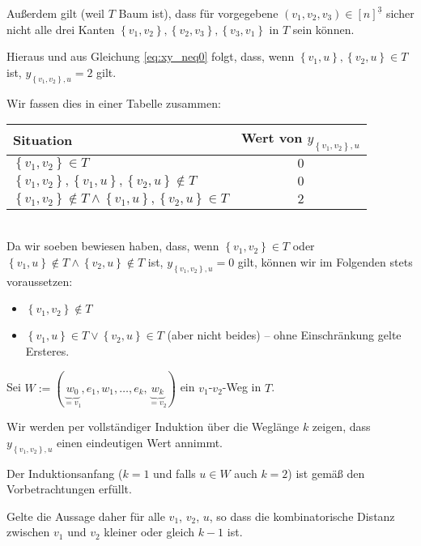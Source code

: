 \documentclass[10p,a4paper,BCOR = 12mm, DIV=15]{scrbook}
\begin{document}
\begin{bew}
Außerdem gilt (weil $T$ Baum ist), dass für vorgegebene $\left(v_1, v_2, v_3\right) \in \left[n\right]^{\underline{3}}$ sicher nicht alle drei Kanten $\left\{v_1, v_2\right\}, \left\{v_2, v_3\right\}, \left\{v_3, v_1\right\}$ in $T$ sein können.

Hieraus und aus Gleichung \eqref{eq:xy_neq0} folgt, dass, wenn $\left\{v_1, u\right\}, \left\{v_2, u\right\} \in T$ ist, $y_{\left\{v_1, v_2\right\}, u} = 2$ gilt.

Wir fassen dies in einer Tabelle zusammen: \\

\begin{tabular}{| l | c |}
\hline
Situation & Wert von $y_{\left\{v_1, v_2\right\}, u}$ \\
\hline
$\left\{v_1, v_2\right\} \in T$ & $0$ \\
$\left\{v_1, v_2\right\}, \left\{v_1, u\right\}, \left\{v_2, u\right\} \notin T$ & $0$ \\
$\left\{v_1, v_2\right\} \notin T \wedge \left\{v_1, u\right\}, \left\{v_2, u\right\} \in T$ & $2$ \\
\hline
\end{tabular} \\

Da wir soeben bewiesen haben, dass, wenn $\left\{v_1, v_2\right\} \in T$ oder $\left\{v_1, u\right\} \notin T \wedge \left\{v_2, u\right\} \notin T$ ist, $y_{\left\{v_1, v_2\right\}, u} = 0$ gilt, können wir im Folgenden stets voraussetzen:
\begin{itemize}
\item $\left\{v_1, v_2\right\} \notin T$
\item $\left\{v_1, u\right\} \in T \vee \left\{v_2, u\right\} \in T$ (aber nicht beides) -- ohne Einschränkung gelte Ersteres.
\end{itemize}

Sei $W:=\left(\underbrace{w_0}_{=v_1}, e_1, w_1, \ldots, e_k, \underbrace{w_k}_{=v_2}\right)$ ein $v_1$-$v_2$-Weg in $T$.

Wir werden per vollständiger Induktion über die Weglänge $k$ zeigen, dass $y_{\left\{v_1, v_2\right\}, u}$ einen eindeutigen Wert annimmt.

Der Induktionsanfang ($k=1$ und falls $u\in W$ auch $k=2$) ist gemäß den Vorbetrachtungen erfüllt.

Gelte die Aussage daher für alle $v_1$, $v_2$, $u$, so dass die kombinatorische Distanz zwischen $v_1$ und $v_2$ kleiner oder gleich $k-1$ ist.


\end{bew}
\end{document}
